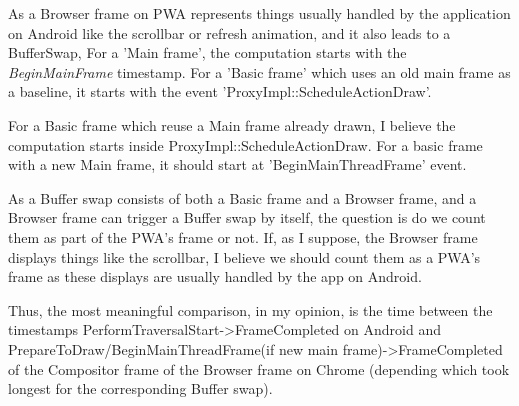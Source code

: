As a Browser frame on PWA represents things usually handled by the application on Android like the scrollbar or refresh animation, and it also leads to a BufferSwap, 
For a 'Main frame', the computation starts with the \textit{BeginMainFrame} timestamp. For a 'Basic frame' which uses an old main frame as a baseline, it starts with the event 'ProxyImpl::ScheduleActionDraw'. 

For a Basic frame which reuse a Main frame already drawn, I believe the computation starts inside ProxyImpl::ScheduleActionDraw. For a basic frame with a new Main frame, it should start at 'BeginMainThreadFrame' event. 

As a Buffer swap consists of both a Basic frame and a Browser frame, and a Browser frame can trigger a Buffer swap by itself, the question is do we count them as part of the PWA's frame or not. If, as I suppose, the Browser frame displays things like the scrollbar, I believe we should count them as a PWA's frame as these displays are usually handled by the app on Android. 

Thus, the most meaningful comparison, in my opinion, is the time between the timestamps PerformTraversalStart->FrameCompleted on Android and PrepareToDraw/BeginMainThreadFrame(if new main frame)->FrameCompleted of the Compositor frame of the Browser frame on Chrome (depending which took longest for the corresponding Buffer swap).

